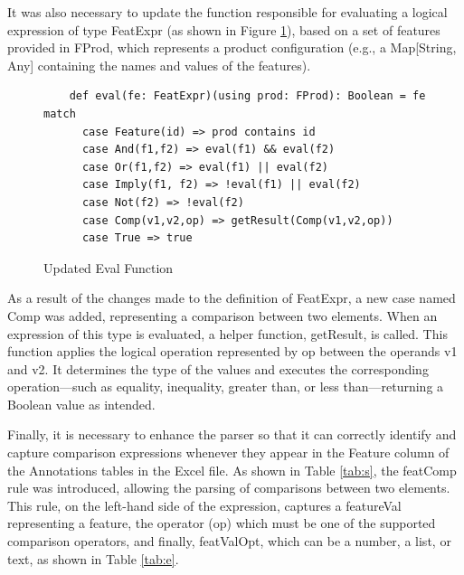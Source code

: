 It was also necessary to update the function responsible for evaluating a logical expression of type FeatExpr (as shown in Figure \ref{fig:Eval}), based on a set of features provided in FProd, which represents a product configuration (e.g., a Map[String, Any] containing the names and values of the features).


\begin{figure}[H]
\centering
\begin{minipage}{0.9\linewidth}
\begin{verbatim}
    def eval(fe: FeatExpr)(using prod: FProd): Boolean = fe match
      case Feature(id) => prod contains id
      case And(f1,f2) => eval(f1) && eval(f2)
      case Or(f1,f2) => eval(f1) || eval(f2)
      case Imply(f1, f2) => !eval(f1) || eval(f2)
      case Not(f2) => !eval(f2)
      case Comp(v1,v2,op) => getResult(Comp(v1,v2,op))
      case True => true
\end{verbatim}
\end{minipage}
\caption{Updated Eval Function}
\label{fig:Eval}
\end{figure}

As a result of the changes made to the definition of FeatExpr, a new case named Comp was added, representing a comparison between two elements. When an expression of this type is evaluated, a helper function, getResult, is called. This function applies the logical operation represented by op between the operands v1 and v2. It determines the type of the values and executes the corresponding operation—such as equality, inequality, greater than, or less than—returning a Boolean value as intended.

Finally, it is necessary to enhance the parser so that it can correctly identify and capture comparison expressions whenever they appear in the Feature column of the Annotations tables in the Excel file. As shown in Table \ref{tab:s}, the featComp rule was introduced, allowing the parsing of comparisons between two elements. This rule, on the left-hand side of the expression, captures a featureVal representing a feature, the operator (op) which must be one of the supported comparison operators, and finally, featValOpt, which can be a number, a list, or text, as shown in Table \ref{tab:e}.



